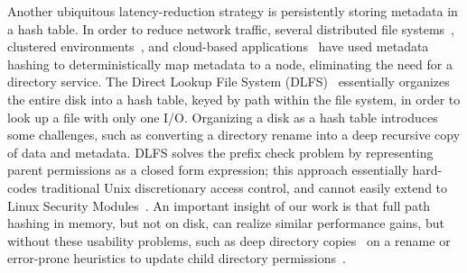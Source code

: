 Another ubiquitous latency-reduction strategy is persistently storing metadata in a hash table.
In order to reduce network traffic, several distributed file systems~\cite{zhu08hba,brandt03,icis12zhang},
clustered environments~\cite{sc09xing,sc12lafon},
and cloud-based applications~\cite{iccsn11wang} have used metadata hashing to deterministically
map metadata to a node, eliminating the need for a directory service.
The Direct Lookup File System (DLFS)~\cite{lensing13dlfs} essentially organizes the entire disk into a hash table,
keyed by path within the file system, in order to look up a file with only one I/O.
Organizing a disk as a hash table introduces some challenges, such as converting a directory rename
into a deep recursive copy of data and metadata.  
DLFS solves the prefix check problem by representing parent permissions as a closed form expression;
this approach essentially hard-codes traditional Unix discretionary access control, and cannot easily extend to Linux Security Modules~\cite{wright+lsm}.
An important insight of our work is that
full path hashing in memory, but not on disk,
can realize similar performance gains,
but without these usability problems, such as deep directory copies~\cite{lensing13dlfs} on a rename
or error-prone heuristics to update child directory permissions~\cite{swift01winnt}.




